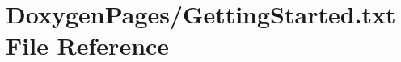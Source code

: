 \hypertarget{_getting_started_8txt}{\section{Doxygen\-Pages/\-Getting\-Started.txt File Reference}
\label{_getting_started_8txt}
}
